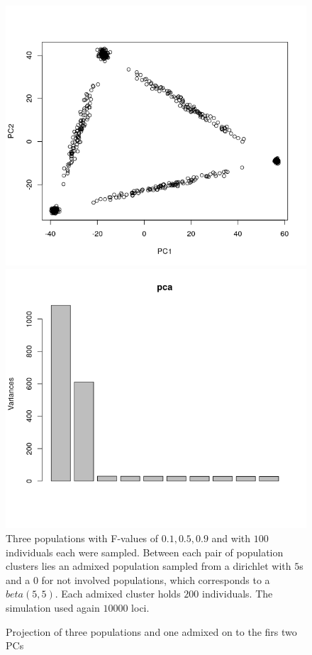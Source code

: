 \documentclass[a4paper, 11pt]{article}
\begin{document}
\begin{figure}[h!]
\caption{Projection of three populations and one admixed on to the firs two PCs}
\includegraphics[scale=0.5]{Rplot_admixed_simplex}
\includegraphics[scale=0.5]{Rplot_eigenvalues_simplex}
Three populations with F-values  of $0.1, 0.5, 0.9$ and with $100$ individuals each were sampled. Between each pair of population clusters lies an admixed population sampled from a dirichlet with $5$s and a $0$ for not involved populations, which corresponds to a $beta(5, 5)$. Each admixed cluster holds $200$ individuals. The simulation used again $10000$ loci.

\centering
\end{figure}
\end{document}
